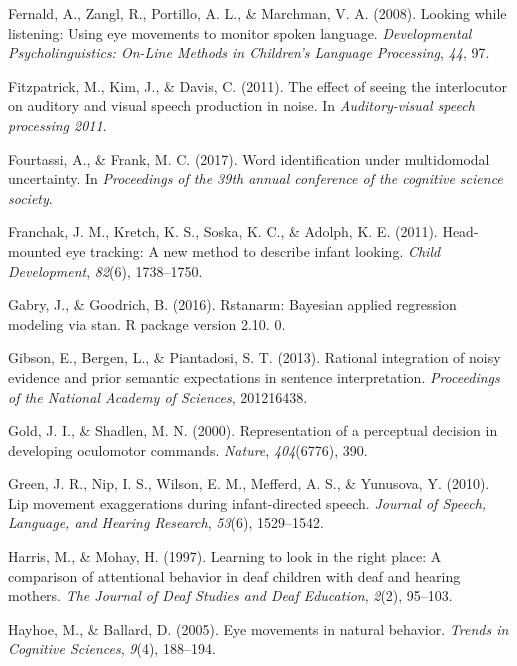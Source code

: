 \documentclass[,man,floatsintext]{apa6}
\begin{document}
\leavevmode\hypertarget{ref-fernald2008looking}{}%
Fernald, A., Zangl, R., Portillo, A. L., \& Marchman, V. A. (2008).
Looking while listening: Using eye movements to monitor spoken language.
\emph{Developmental Psycholinguistics: On-Line Methods in Children's
Language Processing}, \emph{44}, 97.

\leavevmode\hypertarget{ref-fitzpatrick2011effect}{}%
Fitzpatrick, M., Kim, J., \& Davis, C. (2011). The effect of seeing the
interlocutor on auditory and visual speech production in noise. In
\emph{Auditory-visual speech processing 2011}.

\leavevmode\hypertarget{ref-fourtassiword2018}{}%
Fourtassi, A., \& Frank, M. C. (2017). Word identification under
multidomodal uncertainty. In \emph{Proceedings of the 39th annual
conference of the cognitive science society}.

\leavevmode\hypertarget{ref-franchak2011head}{}%
Franchak, J. M., Kretch, K. S., Soska, K. C., \& Adolph, K. E. (2011).
Head-mounted eye tracking: A new method to describe infant looking.
\emph{Child Development}, \emph{82}(6), 1738--1750.

\leavevmode\hypertarget{ref-gabry2016rstanarm}{}%
Gabry, J., \& Goodrich, B. (2016). Rstanarm: Bayesian applied regression
modeling via stan. R package version 2.10. 0.

\leavevmode\hypertarget{ref-gibson2013rational}{}%
Gibson, E., Bergen, L., \& Piantadosi, S. T. (2013). Rational
integration of noisy evidence and prior semantic expectations in
sentence interpretation. \emph{Proceedings of the National Academy of
Sciences}, 201216438.

\leavevmode\hypertarget{ref-gold2000representation}{}%
Gold, J. I., \& Shadlen, M. N. (2000). Representation of a perceptual
decision in developing oculomotor commands. \emph{Nature},
\emph{404}(6776), 390.

\leavevmode\hypertarget{ref-green2010lip}{}%
Green, J. R., Nip, I. S., Wilson, E. M., Mefferd, A. S., \& Yunusova, Y.
(2010). Lip movement exaggerations during infant-directed speech.
\emph{Journal of Speech, Language, and Hearing Research}, \emph{53}(6),
1529--1542.

\leavevmode\hypertarget{ref-harris1997learning}{}%
Harris, M., \& Mohay, H. (1997). Learning to look in the right place: A
comparison of attentional behavior in deaf children with deaf and
hearing mothers. \emph{The Journal of Deaf Studies and Deaf Education},
\emph{2}(2), 95--103.

\leavevmode\hypertarget{ref-hayhoe2005eye}{}%
Hayhoe, M., \& Ballard, D. (2005). Eye movements in natural behavior.
\emph{Trends in Cognitive Sciences}, \emph{9}(4), 188--194.
\end{document}
